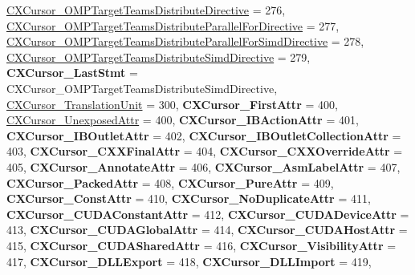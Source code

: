 \begin{DoxyCompactItemize}
\mbox{\hyperlink{group__CINDEX_ggaaccc432245b4cd9f2d470913f9ef0013a440c353a2ae2c6b9473ffce853e42960}{C\+X\+Cursor\+\_\+\+O\+M\+P\+Target\+Teams\+Distribute\+Directive}} = 276, 
\mbox{\hyperlink{group__CINDEX_ggaaccc432245b4cd9f2d470913f9ef0013ace298c5819d3f70bb479c347a7f9fbd3}{C\+X\+Cursor\+\_\+\+O\+M\+P\+Target\+Teams\+Distribute\+Parallel\+For\+Directive}} = 277, 
\mbox{\hyperlink{group__CINDEX_ggaaccc432245b4cd9f2d470913f9ef0013aff552b0c2bb6bc16b8c1414e35a714f7}{C\+X\+Cursor\+\_\+\+O\+M\+P\+Target\+Teams\+Distribute\+Parallel\+For\+Simd\+Directive}} = 278, 
\newline
\mbox{\hyperlink{group__CINDEX_ggaaccc432245b4cd9f2d470913f9ef0013a1f1a5157898609387a7b5c1085bfb202}{C\+X\+Cursor\+\_\+\+O\+M\+P\+Target\+Teams\+Distribute\+Simd\+Directive}} = 279, 
{\bfseries C\+X\+Cursor\+\_\+\+Last\+Stmt} = C\+X\+Cursor\+\_\+\+O\+M\+P\+Target\+Teams\+Distribute\+Simd\+Directive, 
\mbox{\hyperlink{group__CINDEX_ggaaccc432245b4cd9f2d470913f9ef0013a7b14cc488d53714c4a6ecaa58b0af066}{C\+X\+Cursor\+\_\+\+Translation\+Unit}} = 300, 
{\bfseries C\+X\+Cursor\+\_\+\+First\+Attr} = 400, 
\newline
\mbox{\hyperlink{group__CINDEX_ggaaccc432245b4cd9f2d470913f9ef0013a56b1a578c3f15052f83d0c316ed1d4bf}{C\+X\+Cursor\+\_\+\+Unexposed\+Attr}} = 400, 
{\bfseries C\+X\+Cursor\+\_\+\+I\+B\+Action\+Attr} = 401, 
{\bfseries C\+X\+Cursor\+\_\+\+I\+B\+Outlet\+Attr} = 402, 
{\bfseries C\+X\+Cursor\+\_\+\+I\+B\+Outlet\+Collection\+Attr} = 403, 
\newline
{\bfseries C\+X\+Cursor\+\_\+\+C\+X\+X\+Final\+Attr} = 404, 
{\bfseries C\+X\+Cursor\+\_\+\+C\+X\+X\+Override\+Attr} = 405, 
{\bfseries C\+X\+Cursor\+\_\+\+Annotate\+Attr} = 406, 
{\bfseries C\+X\+Cursor\+\_\+\+Asm\+Label\+Attr} = 407, 
\newline
{\bfseries C\+X\+Cursor\+\_\+\+Packed\+Attr} = 408, 
{\bfseries C\+X\+Cursor\+\_\+\+Pure\+Attr} = 409, 
{\bfseries C\+X\+Cursor\+\_\+\+Const\+Attr} = 410, 
{\bfseries C\+X\+Cursor\+\_\+\+No\+Duplicate\+Attr} = 411, 
\newline
{\bfseries C\+X\+Cursor\+\_\+\+C\+U\+D\+A\+Constant\+Attr} = 412, 
{\bfseries C\+X\+Cursor\+\_\+\+C\+U\+D\+A\+Device\+Attr} = 413, 
{\bfseries C\+X\+Cursor\+\_\+\+C\+U\+D\+A\+Global\+Attr} = 414, 
{\bfseries C\+X\+Cursor\+\_\+\+C\+U\+D\+A\+Host\+Attr} = 415, 
\newline
{\bfseries C\+X\+Cursor\+\_\+\+C\+U\+D\+A\+Shared\+Attr} = 416, 
{\bfseries C\+X\+Cursor\+\_\+\+Visibility\+Attr} = 417, 
{\bfseries C\+X\+Cursor\+\_\+\+D\+L\+L\+Export} = 418, 
{\bfseries C\+X\+Cursor\+\_\+\+D\+L\+L\+Import} = 419, 

\end{DoxyCompactItemize}
